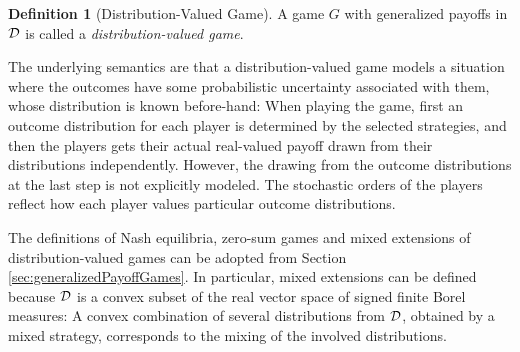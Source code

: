 \documentclass[a4paper]{scrreprt}
\theoremstyle{definition}
\newtheorem{defn}[thm]{Definition} %
\begin{document}
    \begin{defn}[Distribution-Valued Game]
        A game $G$ with generalized payoffs in $\mathcal{D}$ is called a \emph{distribution-valued game}.
        \label{def:distributionValuedGame}
    \end{defn}
    The underlying semantics are that a distribution-valued game models a situation where the outcomes have some probabilistic uncertainty associated with them, whose distribution is known before-hand: When playing the game, first an outcome distribution for each player is determined by the selected strategies, and then the players gets their actual real-valued payoff drawn from their distributions independently.
    However, the drawing from the outcome distributions at the last step is not explicitly modeled. The stochastic orders of the players reflect how each player values particular outcome distributions.

    The definitions of Nash equilibria, zero-sum games and mixed extensions of distribution-valued games can be adopted from Section \ref{sec:generalizedPayoffGames}.
    In particular, mixed extensions can be defined because $\mathcal{D}$ is a convex subset of the real vector space of signed finite Borel measures: A convex combination of several distributions from $\mathcal{D}$, obtained by a mixed strategy, corresponds to the mixing of the involved distributions.
    
\end{document}
